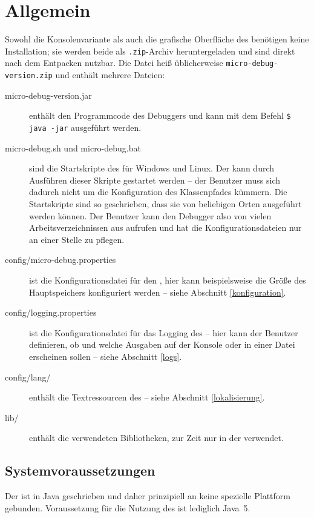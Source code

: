 \chapter{Allgemein}
\label{allgemein}
Sowohl die Konsolenvariante als auch die grafische Oberfläche des \md{} benötigen keine Installation; sie werden beide als \texttt{.zip}-Archiv heruntergeladen und sind direkt nach dem Entpacken nutzbar. Die Datei heiß üblicherweise \texttt{micro-debug-version.zip} und enthält mehrere Dateien:

\begin{description}
\item[micro-debug-version.jar] enthält den Programmcode des Debuggers und kann mit dem Befehl \texttt{\$ java -jar} ausgeführt werden.
\item[micro-debug.sh und micro-debug.bat] sind die Startskripte des \md{} für Windows und Linux. Der \md{} kann durch Ausführen dieser Skripte gestartet werden -- der Benutzer muss sich dadurch nicht um die Konfiguration des Klassenpfades kümmern. Die Startskripte sind so geschrieben, dass sie von beliebigen Orten ausgeführt werden können. Der Benutzer kann den Debugger also von vielen Arbeitsverzeichnissen aus aufrufen und hat die Konfigurationsdateien nur an einer Stelle zu pflegen.
\item[config/micro-debug.properties] ist die Konfigurationsdatei für den \md{}, hier kann beispielsweise die Größe des Hauptspeichers konfiguriert werden -- siehe Abschnitt \ref{konfiguration}.
\item[config/logging.properties] ist die Konfigurationsdatei für das Logging des \md{} -- hier kann der Benutzer definieren, ob und welche Ausgaben auf der Konsole oder in einer Datei erscheinen sollen -- siehe Abschnitt \ref{logs}.
\item[config/lang/] enthält die Textressourcen des \md{} -- siehe Abschnitt \ref{lokalisierung}.
\item[lib/] enthält die verwendeten Bibliotheken, zur Zeit nur in der \mdg{} verwendet.
\end{description}

\section{Systemvoraussetzungen}
\label{systemvoraussetzungen}
Der \md{} ist in Java geschrieben und daher prinzipiell an keine spezielle Plattform gebunden. Voraussetzung für die Nutzung des \md{} ist lediglich Java~5.

